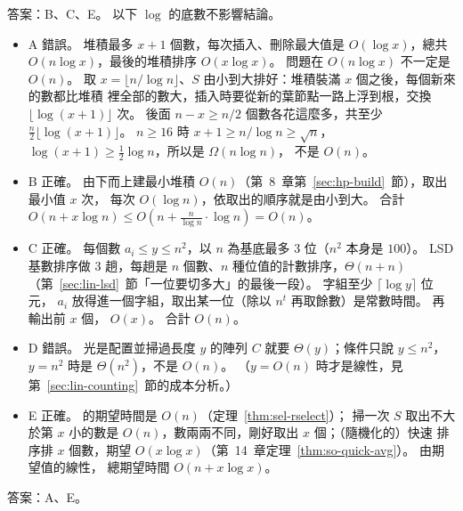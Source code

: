 答案：B、C、E。 以下 $\log$ 的底數不影響結論。
\begin{itemize}
\item A 錯誤。 堆積最多 $x + 1$ 個數，每次插入、刪除最大值是 $O(\log x)$，總共
$O(n \log x)$，最後的堆積排序 $O(x \log x)$。 問題在 $O(n \log x)$ 不一定是 $O(n)$。 取
$x = \lfloor n/\log n \rfloor$、$S$ 由小到大排好：堆積裝滿 $x$ 個之後，每個新來的數都比堆積
裡全部的數大，插入時要從新的葉節點一路上浮到根，交換 $\lfloor \log(x+1) \rfloor$ 次。 後面
$n - x \ge n/2$ 個數各花這麼多，共至少 $\frac{n}{2}\lfloor \log(x+1) \rfloor$。 $n \ge 16$ 時
$x + 1 \ge n/\log n \ge \sqrt{n}$，$\log(x+1) \ge \frac{1}{2}\log n$，所以是 $\Omega(n \log n)$，
不是 $O(n)$。
\item B 正確。 由下而上建最小堆積 $O(n)$（第~8~章第~\ref{sec:hp-build}~節），取出最小值 $x$ 次，
每次 $O(\log n)$，依取出的順序就是由小到大。 合計 $O(n + x \log n) \le
O(n + \frac{n}{\log n} \cdot \log n) = O(n)$。
\item C 正確。 每個數 $a_i \le y \le n^2$，以 $n$ 為基底最多 $3$ 位（$n^2$ 本身是 $100$）。
LSD 基數排序做 $3$ 趟，每趟是 $n$ 個數、$n$ 種位值的計數排序，$\Theta(n + n)$
（第~\ref{sec:lin-lsd}~節「一位要切多大」的最後一段）。 字組至少 $\lceil \log y \rceil$ 位元，
$a_i$ 放得進一個字組，取出某一位（除以 $n^t$ 再取餘數）是常數時間。 再輸出前 $x$ 個，
$O(x)$。 合計 $O(n)$。
\item D 錯誤。 光是配置並掃過長度 $y$ 的陣列 $C$ 就要 $\Theta(y)$；條件只說 $y \le n^2$，
$y = n^2$ 時是 $\Theta(n^2)$，不是 $O(n)$。 （$y = O(n)$ 時才是線性，見第~\ref{sec:lin-counting}~節的成本分析。）
\item E 正確。  的期望時間是 $O(n)$（定理~\ref{thm:sel-rselect}）；
掃一次 $S$ 取出不大於第 $x$ 小的數是 $O(n)$，數兩兩不同，剛好取出 $x$ 個；（隨機化的）快速
排序排 $x$ 個數，期望 $O(x \log x)$（第~14~章定理~\ref{thm:so-quick-avg}）。 由期望值的線性，
總期望時間 $O(n + x \log x)$。
\end{itemize}

答案：A、E。

